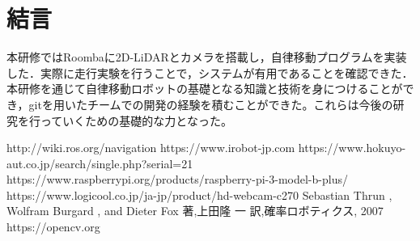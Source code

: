 \documentclass{jarticle}
\begin{document}
\begin{table}[h]
\caption{白線検知実験結果}
\label{table:white_ditect}
\end{table}

\section{結言}
本研修ではRoombaに2D-LiDARとカメラを搭載し，自律移動プログラムを実装した．実際に走行実験を行うことで，システムが有用であることを確認できた．本研修を通じて自律移動ロボットの基礎となる知識と技術を身につけることができ，gitを用いたチームでの開発の経験を積むことができた。これらは今後の研究を行っていくための基礎的な力となった。
\begin{thebibliography}{99}\scriptsize
	 http://wiki.ros.org/navigation
\vspace{-2mm}
	 https://www.irobot-jp.com
\vspace{-2mm}
	 https://www.hokuyo-aut.co.jp/search/single.php?serial=21
\vspace{-2mm}
	 https://www.raspberrypi.org/products/raspberry-pi-3-model-b-plus/
\vspace{-2mm}
	 https://www.logicool.co.jp/ja-jp/product/hd-webcam-c270
\vspace{-2mm}
	 Sebastian Thrun , Wolfram Burgard , and Dieter Fox 著,上田隆	一 訳,確率ロボティクス, 2007
\vspace{-2mm}
	 https://opencv.org
\end{thebibliography}
\end{document}
